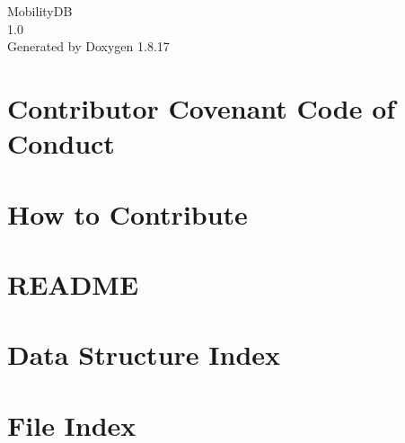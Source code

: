 \let\mypdfximage\pdfximage\def\pdfximage{\immediate\mypdfximage}\documentclass[twoside]{book}
\newcommand{\+}{\discretionary{\mbox{\scriptsize$\hookleftarrow$}}{}{}}
\newcommand{\clearemptydoublepage}{%
  \newpage{\pagestyle{empty}\cleardoublepage}%
}
\begin{document}
\hypersetup{pageanchor=false,
             bookmarksnumbered=true,
             pdfencoding=unicode
            }
\begin{titlepage}
\vspace*{7cm}
\begin{center}%
{\Large Mobility\+DB \\[1ex]\large 1.\+0 }\\
\vspace*{1cm}
{\large Generated by Doxygen 1.8.17}\\
\end{center}
\end{titlepage}
\clearemptydoublepage
{}
\tableofcontents
\clearemptydoublepage
{}
\hypersetup{pageanchor=true}

\chapter{Contributor Covenant Code of Conduct}
\label{md_code-of-conduct}

\chapter{How to Contribute}
\label{md_CONTRIBUTING}

\chapter{R\+E\+A\+D\+ME}
\label{md_README}

\chapter{Data Structure Index}

\chapter{File Index}

\end{document}
